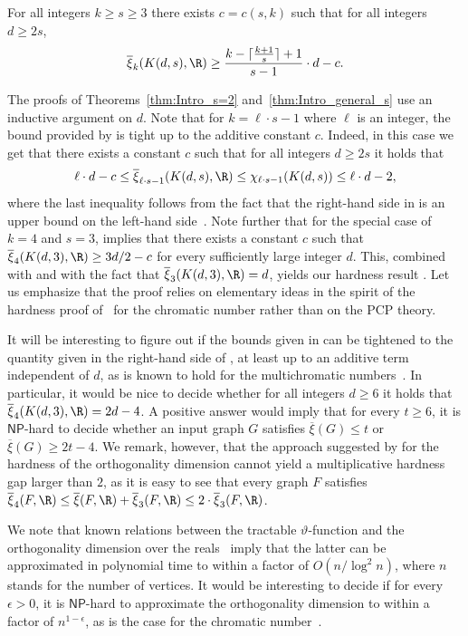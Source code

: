 \documentclass{toc}
\newcommand{\NP}{\mathsf{NP}}
\newcommand{\od}{\overline{\xi}}
\newcommand{\eps}{\epsilon}
\begin{document}
\begin{theorem}\label{thm:Intro_general_s}
For %
all %
integers $k \geq s \geq 3$ there exists $c=c(s,k)$ such that for all integers $d \geq 2s$,
\[\od_{k}(K(d,s),\R) \geq \frac{k- \lceil \frac{k+1}{s} \rceil +1}{s-1} \cdot d-c.\]
\end{theorem}
%
%
%
%
\noindent
The proofs of Theorems~\ref{thm:Intro_s=2} and~\ref{thm:Intro_general_s} use an inductive argument on $d$.
Note that for $k = \ell \cdot s -1$ where $\ell$ is an integer, the bound provided by  is tight up to the additive constant $c$.
Indeed, in this case we get that there exists a constant $c$ such that for all integers $d \geq 2s$ it holds that
\[\ell \cdot d -c \leq \od_{\ell \cdot s-1}(K(d,s),\R) \leq \chi_{\ell \cdot s-1}(K(d,s)) \leq \ell \cdot d -2,\]
where the last inequality follows from the fact that the right-hand side in  is an upper bound on the left-hand side~\cite{Stahl76}.
Note further that for the special case of $k=4$ and $s=3$,  implies that there exists a constant $c$ such that $\od_4(K(d,3),\R) \geq 3d/2-c$ for every sufficiently large integer $d$. This, combined with  and with the fact that $\od_3(K(d,3),\R) = d$, yields our hardness result .
%
Let us emphasize that the proof relies on elementary ideas in the spirit of the hardness proof of~\cite{GareyJ76a} for the chromatic number rather than on the PCP theory.

It will be interesting to figure out if the bounds given in  can be tightened to the quantity given in the right-hand side of , at least up to an additive term independent of $d$, as is known to hold for the multichromatic numbers~\cite{Stahl98}.
%
%
%
%
%
%
In particular, it %
would  %
be nice to decide whether for all integers $d \geq 6$ it holds that $\od_4(K(d,3),\R) = 2d-4$.
A positive answer would imply that for every $t \geq 6$, it is $\NP$-hard to decide whether an input graph $G$ satisfies $\od(G) \leq t$ or $\od(G) \geq 2t-4$. We remark, however, that the approach suggested by  for the hardness of the orthogonality dimension cannot yield a multiplicative hardness gap larger than $2$, as it is easy to see that every graph $F$ satisfies $\od_4(F,\R) \leq \od(F,\R) + \od_3(F,\R) \leq 2 \cdot \od_3(F,\R)$.

We note that known relations between the tractable $\vartheta$-function and the orthogonality dimension over the reals~\cite{Lovasz79} imply that the latter can be approximated in polynomial time to within a factor of $O(n/\log^2 n)$, where $n$ stands for the number of vertices.
It would be interesting to decide if for %
%
every  %
$\eps >0$, it is $\NP$-hard to approximate the orthogonality dimension to within a factor of $n^{1-\eps}$, as is the case for the chromatic number~\cite{Zuckerman07}.
\end{document}
